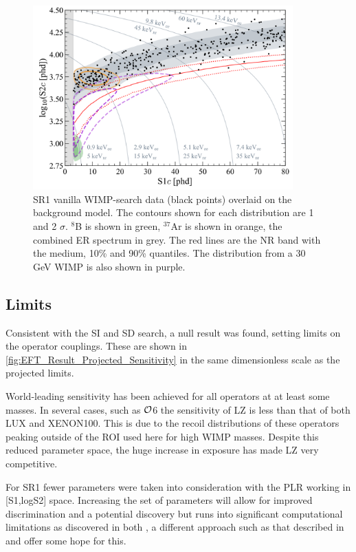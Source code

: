 \begin{figure}
    \centering
    \includegraphics[width=10cm]{Figures/EFT/All_SR1_Plots/final_data_points.png}
    \caption{SR1 vanilla WIMP-search data (black points) overlaid on the background model.
    The contours shown for each distribution are 1 and 2 $\sigma$.
    ${}^{8}$B is shown in green, ${}^{37}$Ar is shown in orange, the combined ER spectrum in grey.
    The red lines are the NR band with the medium, 10\% and 90\% quantiles.
    The distribution from a 30 GeV WIMP is also shown in purple. 
    }
    \label{fig:final_data_points}
\end{figure}

\subsection{Limits}
\par
Consistent with the SI and SD search, a null result was found, setting limits on the operator couplings.
These are shown in \autoref{fig:EFT_Result_Projected_Sensitivity} in the same dimensionless scale as the projected limits.
\par
World-leading sensitivity has been achieved for all operators at at least some masses.
In several cases, such as $\operatorname{\mathcal{O}}$6 the sensitivity of LZ is less than that of both LUX and XENON100. 
This is due to the recoil distributions of these operators peaking outside of the ROI used here for high WIMP masses.
Despite this reduced parameter space, the huge increase in exposure has made LZ very competitive.



For SR1 fewer parameters were taken into consideration with the PLR working in [S1,logS2] space.
Increasing the set of parameters will allow for improved discrimination and a potential discovery but runs into significant computational limitations as discovered in both \cite{nicolelarsen_thesis_ref, shaunalsum_thesis_ref, billyboxer_thesis_ref}, a different approach such as that described in \cite{flamenest_ref} and \cite{lux_ml_plr_ref} offer some hope for this.


